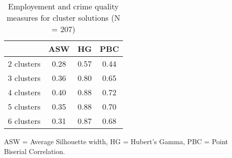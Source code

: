 \begin{table}[htp]
\footnotesize
\setlength{\tabcolsep}{35pt}
\renewcommand{\arraystretch}{1.3}
\begin{threeparttable}
\centering
\caption{Employement and crime quality measures for cluster solutions (N = 207)} 
\label{tab:quality_clusters_job_crime}
\begin{tabular}{lccc}
  \hline
 & ASW & HG & PBC \\ 
  \hline
2 clusters & 0.28 & 0.57 & 0.44 \\ 
  3 clusters & 0.36 & 0.80 & 0.65 \\ 
  4 clusters & 0.40 & 0.88 & 0.72 \\ 
  5 clusters & 0.35 & 0.88 & 0.70 \\ 
  6 clusters & 0.31 & 0.87 & 0.68 \\ 
   \hline
\end{tabular}
\begin{tablenotes}
\scriptsize
\item ASW = Average Silhouette width, HG = Hubert's Gamma, PBC = Point Biserial Correlation.
\end{tablenotes}
\end{threeparttable}
\end{table}

